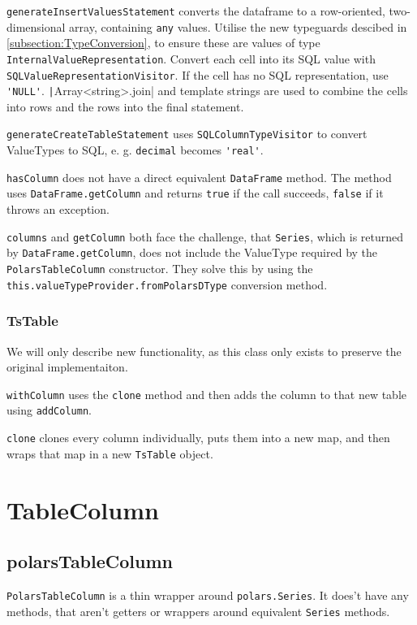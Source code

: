 \Verb|generateInsertValuesStatement| converts the dataframe to a row-oriented, two-dimensional array, containing \Verb|any| values.
Utilise the new typeguards descibed in \ref{subsection:TypeConversion}, to ensure these are values of type \Verb|InternalValueRepresentation|.
Convert each cell into its \ac{SQL} value with \Verb|SQLValueRepresentationVisitor|.
If the cell has no \ac{SQL} representation, use \Verb|'NULL'|.
\texttt|Array<string>.join| and template strings are used to combine the cells into rows and the rows into the final statement.

\Verb|generateCreateTableStatement| uses \Verb|SQLColumnTypeVisitor| to convert ValueTypes to \ac{SQL}, e. g. \Verb|decimal| becomes \Verb|'real'|.

\Verb|hasColumn| does not have a direct equivalent \Verb|DataFrame| method.
The method uses \Verb|DataFrame.getColumn| and returns \Verb|true| if the call succeeds, \Verb|false| if it throws an exception.

\Verb|columns| and \Verb|getColumn| both face the challenge, that \Verb|Series|, which is returned by \Verb|DataFrame.getColumn|, does not include the ValueType required by the \Verb|PolarsTableColumn| constructor.
They solve this by using the \Verb|this.valueTypeProvider.fromPolarsDType| conversion method.

\subsubsection{TsTable}
We will only describe new functionality, as this class only exists to preserve the original implementaiton.

\Verb|withColumn| uses the \Verb|clone| method and then adds the column to that new table using \Verb|addColumn|.

\Verb|clone| clones every column individually, puts them into a new map, and then wraps that map in a new \Verb|TsTable| object.

\section{TableColumn}
\subsection{polarsTableColumn}
\Verb|PolarsTableColumn| is a thin wrapper around \Verb|polars.Series|.
It does't have any methods, that aren't getters or wrappers around equivalent \Verb|Series| methods.

